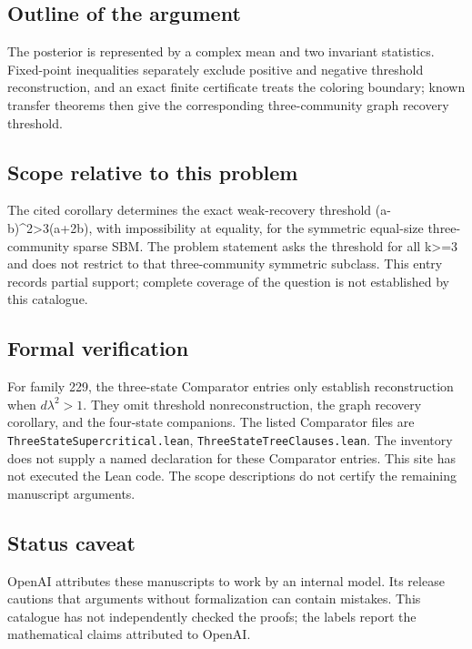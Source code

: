 \documentclass[11pt]{article}
\begin{document}
\subsection{Outline of the argument}
The posterior is represented by a complex mean and two invariant statistics. Fixed-point inequalities separately exclude positive and negative threshold reconstruction, and an exact finite certificate treats the coloring boundary; known transfer theorems then give the corresponding three-community graph recovery threshold.

\subsection{Scope relative to this problem}
The cited corollary determines the exact weak-recovery threshold (a-b)\textasciicircum{}2>3(a+2b), with impossibility at equality, for the symmetric equal-size three-community sparse SBM. The problem statement asks the threshold for all k>=3 and does not restrict to that three-community symmetric subclass. This entry records partial support; complete coverage of the question is not established by this catalogue.

\subsection{Formal verification}
For family 229, the three-state Comparator entries only establish reconstruction when $d\lambda^2>1$. They omit threshold nonreconstruction, the graph recovery corollary, and the four-state companions. The listed Comparator files are \texttt{ThreeStateSupercritical.lean}, \texttt{ThreeStateTreeClauses.lean}. The inventory does not supply a named declaration for these Comparator entries. This site has not executed the Lean code. The scope descriptions do not certify the remaining manuscript arguments.

\subsection{Status caveat}
OpenAI attributes these manuscripts to work by an internal model. Its release cautions that arguments without formalization can contain mistakes. This catalogue has not independently checked the proofs; the labels report the mathematical claims attributed to OpenAI.
\end{document}

